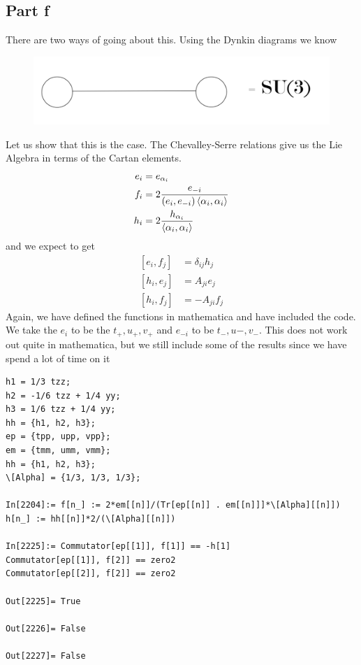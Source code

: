 \documentclass[a4paper,12pt]{article}
\begin{document}
\subsection*{Part f}
There are two ways of going about this. Using the Dynkin diagrams we know
\begin{figure}[H]
	\centering
	\includegraphics[width=0.6\linewidth]{30}
\end{figure} 
Let us show that this is the case. The Chevalley-Serre relations give us the Lie Algebra in terms of the Cartan elements.
\begin{equation}
	\begin{aligned}
		e_{i}&=e_{\alpha_i}\\
		f_{i}&=2\frac{e_{-i}}{(e_i,e_{-i})\expval{\alpha_i,\alpha_i}}\\
		h_i&=2\frac{h_{\alpha_i}}{\expval{\alpha_i,\alpha_i}}
	\end{aligned}
\end{equation}
and we expect to get
\begin{equation}
	\begin{aligned}
		[e_i,f_j]&=\delta_{ij}h_j\\
		[h_i,e_j]&=A_{ji}e_j\\
		[h_i,f_j]&=-A_{ji}f_j
	\end{aligned}
\end{equation}
Again, we have defined the functions in mathematica and have included the code. We take the $e_{i}$ to be the $t_+,u_+,v_+$ and $e_{-i}$ to be $t_-,u-,v_-$. This does not work out quite in mathematica, but we still include some of the results since we have spend a lot of time on it
\begin{lstlisting}
h1 = 1/3 tzz;
h2 = -1/6 tzz + 1/4 yy;
h3 = 1/6 tzz + 1/4 yy;
hh = {h1, h2, h3};
ep = {tpp, upp, vpp};
em = {tmm, umm, vmm};
hh = {h1, h2, h3};
\[Alpha] = {1/3, 1/3, 1/3};

In[2204]:= f[n_] := 2*em[[n]]/(Tr[ep[[n]] . em[[n]]]*\[Alpha][[n]])
h[n_] := hh[[n]]*2/(\[Alpha][[n]])

In[2225]:= Commutator[ep[[1]], f[1]] == -h[1]
Commutator[ep[[1]], f[2]] == zero2
Commutator[ep[[2]], f[2]] == zero2

Out[2225]= True

Out[2226]= False

Out[2227]= False
\end{lstlisting}
\end{document}
